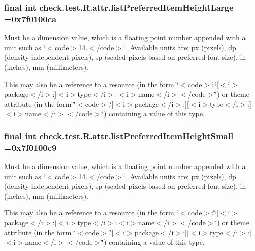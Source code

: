 \subsubsection[{list\+Preferred\+Item\+Height\+Large}]{\setlength{\rightskip}{0pt plus 5cm}final int check.\+test.\+R.\+attr.\+list\+Preferred\+Item\+Height\+Large =0x7f0100ca\hspace{0.3cm}{\ttfamily [static]}}\label{classcheck_1_1test_1_1_r_1_1attr_aabce9b732bbded79dc2e9a7fe1c57972}
Must be a dimension value, which is a floating point number appended with a unit such as \char`\"{}$<$code$>$14.\+5sp$<$/code$>$\char`\"{}. Available units are\+: px (pixels), dp (density-\/independent pixels), sp (scaled pixels based on preferred font size), in (inches), mm (millimeters). 

This may also be a reference to a resource (in the form \char`\"{}$<$code$>$@\mbox{[}$<$i$>$package$<$/i$>$\+:\mbox{]}$<$i$>$type$<$/i$>$\+:$<$i$>$name$<$/i$>$$<$/code$>$\char`\"{}) or theme attribute (in the form \char`\"{}$<$code$>$?\mbox{[}$<$i$>$package$<$/i$>$\+:\mbox{]}\mbox{[}$<$i$>$type$<$/i$>$\+:\mbox{]}$<$i$>$name$<$/i$>$$<$/code$>$\char`\"{}) containing a value of this type. \hypertarget{classcheck_1_1test_1_1_r_1_1attr_a7399d398414e42a4ede3472ad153331c}{}
\subsubsection[{list\+Preferred\+Item\+Height\+Small}]{\setlength{\rightskip}{0pt plus 5cm}final int check.\+test.\+R.\+attr.\+list\+Preferred\+Item\+Height\+Small =0x7f0100c9\hspace{0.3cm}{\ttfamily [static]}}\label{classcheck_1_1test_1_1_r_1_1attr_a7399d398414e42a4ede3472ad153331c}
Must be a dimension value, which is a floating point number appended with a unit such as \char`\"{}$<$code$>$14.\+5sp$<$/code$>$\char`\"{}. Available units are\+: px (pixels), dp (density-\/independent pixels), sp (scaled pixels based on preferred font size), in (inches), mm (millimeters). 

This may also be a reference to a resource (in the form \char`\"{}$<$code$>$@\mbox{[}$<$i$>$package$<$/i$>$\+:\mbox{]}$<$i$>$type$<$/i$>$\+:$<$i$>$name$<$/i$>$$<$/code$>$\char`\"{}) or theme attribute (in the form \char`\"{}$<$code$>$?\mbox{[}$<$i$>$package$<$/i$>$\+:\mbox{]}\mbox{[}$<$i$>$type$<$/i$>$\+:\mbox{]}$<$i$>$name$<$/i$>$$<$/code$>$\char`\"{}) containing a value of this type. \hypertarget{classcheck_1_1test_1_1_r_1_1attr_a5c876f039bc3f86b36be1456b3b363ae}{}
